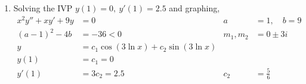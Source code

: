 \begin{enumerate}
    \item Solving the IVP $ y(1) = 0,\ y'(1) = 2.5 $ and graphing,
          \begin{align}
              x^{2}y'' + xy' + 9y & = 0                                       & a            & = 1, \quad b= 9 \\
              (a-1)^{2}-4b        & = -36 < 0                                 & m_{1}, m_{2} & =  0 \pm 3i     \\
              y                   & = c_{1}\cos(3 \ln x) + c_{2}\sin(3 \ln x)                                  \\
              y(1)                & = c_{1} = 0                                                                \\
              y'(1)               & = 3c_{2} = 2.5                            & c_{2}        & = \frac{5}{6}
          \end{align}
          \begin{figure}[H]
              \centering
          \end{figure}


\end{enumerate}
